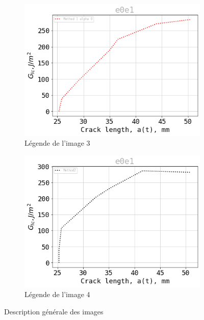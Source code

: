 \documentclass[3p,times,procedia]{elsarticle}
\begin{document}
\begin{figure}[htbp]
\begin{subfigure}[b]{0.45\textwidth}
		\includegraphics[width=\textwidth]{Figures/Gmet1_e0e1}
		\caption{Légende de l'image 3}
		\label{fig:image3}
	\end{subfigure}
	\hfill
	\begin{subfigure}[b]{0.45\textwidth}
		\centering
		\includegraphics[width=\textwidth]{Figures/Gmet2_e0e1}
		\caption{Légende de l'image 4}
		\label{fig:image4}
	\end{subfigure}
	\caption{Description générale des images}
	\label{fig:images}
\end{figure}
\end{document}
